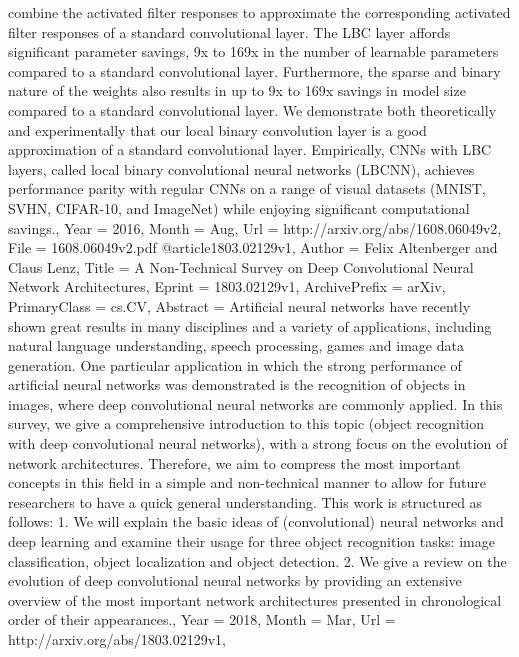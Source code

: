 {{{{{combine the activated filter responses to approximate the corresponding
activated filter responses of a standard convolutional layer. The LBC layer
affords significant parameter savings, 9x to 169x in the number of learnable
parameters compared to a standard convolutional layer. Furthermore, the sparse
and binary nature of the weights also results in up to 9x to 169x savings in
model size compared to a standard convolutional layer. We demonstrate both
theoretically and experimentally that our local binary convolution layer is a
good approximation of a standard convolutional layer. Empirically, CNNs with
LBC layers, called local binary convolutional neural networks (LBCNN), achieves
performance parity with regular CNNs on a range of visual datasets (MNIST,
SVHN, CIFAR-10, and ImageNet) while enjoying significant computational savings.},
Year          = {2016},
Month         = {Aug},
Url           = {http://arxiv.org/abs/1608.06049v2},
File          = {1608.06049v2.pdf}
}
@article{1803.02129v1,
Author        = {Felix Altenberger and Claus Lenz},
Title         = {A Non-Technical Survey on Deep Convolutional Neural Network
  Architectures},
Eprint        = {1803.02129v1},
ArchivePrefix = {arXiv},
PrimaryClass  = {cs.CV},
Abstract      = {Artificial neural networks have recently shown great results in many
disciplines and a variety of applications, including natural language
understanding, speech processing, games and image data generation. One
particular application in which the strong performance of artificial neural
networks was demonstrated is the recognition of objects in images, where deep
convolutional neural networks are commonly applied. In this survey, we give a
comprehensive introduction to this topic (object recognition with deep
convolutional neural networks), with a strong focus on the evolution of network
architectures. Therefore, we aim to compress the most important concepts in
this field in a simple and non-technical manner to allow for future researchers
to have a quick general understanding.
  This work is structured as follows:
  1. We will explain the basic ideas of (convolutional) neural networks and
deep learning and examine their usage for three object recognition tasks: image
classification, object localization and object detection.
  2. We give a review on the evolution of deep convolutional neural networks by
providing an extensive overview of the most important network architectures
presented in chronological order of their appearances.},
Year          = {2018},
Month         = {Mar},
Url           = {http://arxiv.org/abs/1803.02129v1},
}}}}
